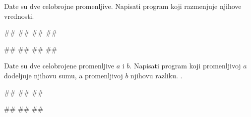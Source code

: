 \begin{Exercise}[label=v1.1_10] 
Date su dve celobrojne promenljive. Napisati program koji razmenjuje njihove vrednosti.

\begin{miditest}
\begin{upotreba}{1}
#\naslovInt#
##
##
##
\end{upotreba}
\end{miditest}
\begin{miditest}
\begin{upotreba}{2}
#\naslovInt#
##
##
##
\end{upotreba}
\end{miditest}

\end{Exercise}
\ifresenja
\begin{Answer}[ref=v1.1_10]
\end{Answer}
\fi

\begin{Exercise}[label=p1_14]
Date su dve celobrojene promenljive $a$ i $b$. Napisati program koji promenljivoj $a$ dodeljuje
njihovu sumu, a promenljivoj $b$ njihovu razliku. . 

\begin{miditest}
\begin{upotreba}{1}
#\naslovInt#
##
##
\end{upotreba}
\end{miditest}
\begin{miditest}
\begin{upotreba}{2}
#\naslovInt#
##
##
\end{upotreba}
\end{miditest}

\end{Exercise}



